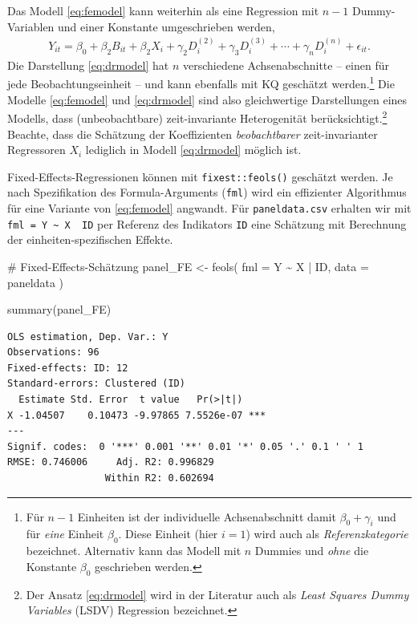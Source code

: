 \documentclass[
  a4paper,
  DIV=11,
  oneside]{scrreprt}
\newenvironment{Shaded}{\begin{snugshade}}{\end{snugshade}}
\newcommand{\AttributeTok}[1]{\textcolor[rgb]{0.40,0.45,0.13}{#1}}
\newcommand{\CommentTok}[1]{\textcolor[rgb]{0.37,0.37,0.37}{#1}}
\newcommand{\FunctionTok}[1]{\textcolor[rgb]{0.28,0.35,0.67}{#1}}
\newcommand{\NormalTok}[1]{\textcolor[rgb]{0.00,0.23,0.31}{#1}}
\newcommand{\OtherTok}[1]{\textcolor[rgb]{0.00,0.23,0.31}{#1}}
\newcommand{\SpecialCharTok}[1]{\textcolor[rgb]{0.37,0.37,0.37}{#1}}
\begin{document}
Das Modell \eqref{eq:femodel} kann weiterhin als eine Regression mit
\(n-1\) Dummy-Variablen und einer Konstante umgeschrieben werden,
\begin{align}
  Y_{it} = \beta_0 + \beta_2 B_{it} + \beta_2 X_i  + \gamma_2 D^{(2)}_i + \gamma_3 D^{(3)}_i + \cdots + \gamma_n D^{(n)}_i + \epsilon_{it} \label{eq:drmodel}.
\end{align} Die Darstellung \eqref{eq:drmodel} hat \(n\) verschiedene
Achsenabschnitte -- einen für jede Beobachtungseinheit -- und kann
ebenfalls mit KQ geschätzt werden.\footnote{Für \(n-1\) Einheiten ist
  der individuelle Achsenabschnitt damit \(\beta_0 + \gamma_i\) und für
  \emph{eine} Einheit \(\beta_0\). Diese Einheit (hier \(i=1\)) wird
  auch als \emph{Referenzkategorie} bezeichnet. Alternativ kann das
  Modell mit \(n\) Dummies und \emph{ohne} die Konstante \(\beta_0\)
  geschrieben werden.} Die Modelle \eqref{eq:femodel} und
\eqref{eq:drmodel} sind also gleichwertige Darstellungen eines Modells,
dass (unbeobachtbare) zeit-invariante Heterogenität
berücksichtigt.\footnote{Der Ansatz \eqref{eq:drmodel} wird in der
  Literatur auch als \emph{Least Squares Dummy Variables} (LSDV)
  Regression bezeichnet.} Beachte, dass die Schätzung der Koeffizienten
\emph{beobachtbarer} zeit-invarianter Regressoren \(X_{i}\) lediglich in
Modell \eqref{eq:drmodel} möglich ist.

Fixed-Effects-Regressionen können mit \texttt{fixest::feols()} geschätzt
werden. Je nach Spezifikation des Formula-Arguments (\texttt{fml}) wird
ein effizienter Algorithmus für eine Variante von \eqref{eq:femodel}
angwandt. Für \texttt{paneldata.csv} erhalten wir mit
\texttt{fml\ =\ Y\ \textasciitilde{}\ X\ \textbar{}\ ID} per Referenz
des Indikators \texttt{ID} eine Schätzung mit Berechnung der
einheiten-spezifischen Effekte.

\begin{Shaded}
\begin{Highlighting}[]
\CommentTok{\# Fixed{-}Effects{-}Schätzung}
\NormalTok{panel\_FE }\OtherTok{\textless{}{-}} \FunctionTok{feols}\NormalTok{(}
  \AttributeTok{fml =}\NormalTok{ Y }\SpecialCharTok{\textasciitilde{}}\NormalTok{ X }\SpecialCharTok{|}\NormalTok{ ID,  }
  \AttributeTok{data =}\NormalTok{ paneldata}
\NormalTok{)}

\FunctionTok{summary}\NormalTok{(panel\_FE)}
\end{Highlighting}
\end{Shaded}

\begin{verbatim}
OLS estimation, Dep. Var.: Y
Observations: 96
Fixed-effects: ID: 12
Standard-errors: Clustered (ID) 
  Estimate Std. Error  t value   Pr(>|t|)    
X -1.04507    0.10473 -9.97865 7.5526e-07 ***
---
Signif. codes:  0 '***' 0.001 '**' 0.01 '*' 0.05 '.' 0.1 ' ' 1
RMSE: 0.746006     Adj. R2: 0.996829
                 Within R2: 0.602694
\end{verbatim}
\end{document}
